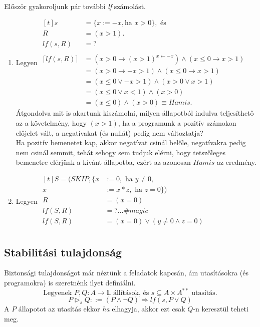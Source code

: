 \documentclass[12pt]{article}
\begin{document}
\paragraph{}Először gyakoroljunk pár további \textit{lf} számolást.\\
\begin{enumerate}
	\item  Legyen $\begin{aligned}[t]
			s &= \{x := -x, \text{ha } x>0\}, \text{ és}\\
			R &= (x>1).\\
			lf(s,R) &= ? \\
			 \\
			\lceil lf(s,R) \rceil &= (x>0 \rightarrow (x>1)^{x \leftarrow -x}) \land (x \le 0 \rightarrow x > 1) \\
			&= (x>0 \rightarrow -x>1 ) \land (x \le 0 \rightarrow x > 1) \\
			&= (x \le 0 \lor -x > 1) \land (x > 0 \lor x > 1) \\
			&= (x \le 0 \lor x < 1) \land (x>0) \\
			&= (x \le 0) \land (x>0) \equiv Hamis.
			\end{aligned}$\\
		Átgondolva mit is akartunk kiszámolni, milyen állapotból indulva teljesíthető az a követelmény, hogy $(x>1)$, ha a programunk a pozitív számokon előjelet vált, a negatívakat (és nullát) pedig nem változtatja?\\
		Ha pozitív bemenetet kap, akkor negatívat csinál belőle, negatívakra pedig nem csinál semmit, tehát sehogy sem tudjuk elérni, hogy tetszőleges bemenetre elérjünk a kívánt állapotba, ezért az azonosan $Hamis$ az eredmény.
	\item Legyen $\begin{aligned}[t]
	S = (SKIP, \{x&:=0, \text{ ha } y \ne 0, \\
				x&:=x*z, \text{ ha } z = 0\})\\
				R &= (x=0)\\
	lf(S,R) &= ? \dots \#magic\\
	lf(S,R) &= (x=0) \lor (y \ne 0 \land z=0)\\
	\end{aligned}$\\
\end{enumerate}

\subsection{Stabilitási tulajdonság}
Biztonsági tulajdonságot már néztünk a feladatok kapcsán, ám utasításokra (és programokra) is szeretnénk ilyet definiálni.
$$\text{Legyenek }P,Q: A \rightarrow \mathbb{L} \text{ állítások, és } s \subseteq A \times A^{**} \text{ utasítás.}$$
$$P \vartriangleright_s Q ::= (P \land \neg Q) \Rightarrow lf(s, P \lor Q)$$
A $P$ állapotot az utasítás ekkor \textit{ha} elhagyja, akkor ezt csak $Q$-n keresztül teheti meg.
\end{document}
